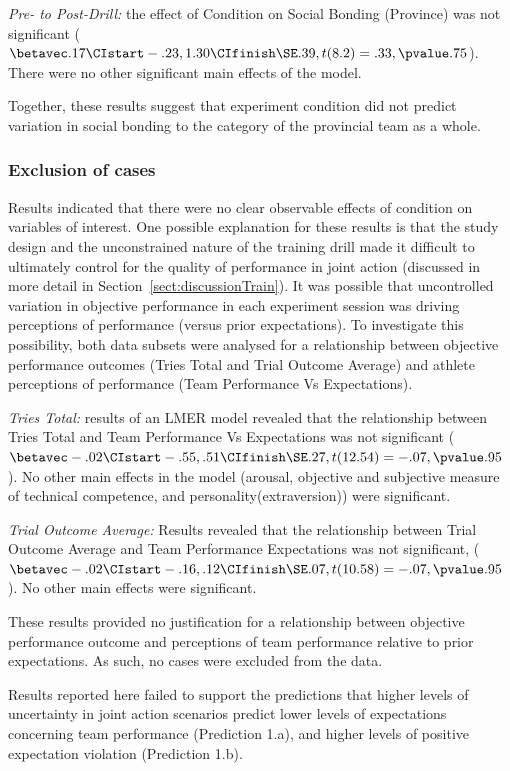 \begin{CJK}{UTF8}{gbsn}
\textit{Pre- to Post-Drill:} the effect of Condition on Social Bonding (Province) was not significant ($\betavec .17 \CIstart -.23, 1.30 \CIfinish \SE .39, t(8.2)= .33, \pvalue .75$). There were no other significant main effects of the model.

Together, these results suggest that experiment condition did not predict variation in social bonding to the category of the provincial team as a whole.



\subsubsection{Exclusion of cases}
Results indicated that there were no clear observable effects of condition on variables of interest.  One possible explanation for these results is that the study design and the unconstrained nature of the training drill made it difficult to ultimately control for the quality of performance in joint action (discussed in more detail in Section~\ref{sect:discussionTrain}).  It was possible that uncontrolled variation in objective performance in each experiment session was driving perceptions of performance (versus prior expectations).  To investigate this possibility, both data subsets were analysed for a relationship between objective performance outcomes (Tries Total and Trial Outcome Average) and athlete perceptions of performance (Team Performance Vs Expectations).

\textit{Tries Total:} results of an LMER model revealed that the relationship between Tries Total and Team Performance Vs Expectations was not significant ($\betavec -.02 \CIstart -.55, .51 \CIfinish \SE .27, t(12.54)= -.07, \pvalue .95$).  No other main effects in the model (arousal, objective and subjective measure of technical competence, and personality(extraversion)) were significant.

\textit{Trial Outcome Average:} Results revealed that the relationship between Trial Outcome Average and Team Performance Expectations was not significant, ($\betavec -.02 \CIstart -.16, .12 \CIfinish \SE .07, t(10.58)= -.07, \pvalue .95$). No other main effects were significant.

These results provided no justification for a relationship between objective performance outcome and perceptions of team performance relative to prior expectations.  As such, no cases were excluded from the data.

Results reported here failed to support the predictions that higher levels of uncertainty in joint action scenarios predict lower levels of expectations concerning team performance (Prediction 1.a), and higher levels of positive expectation violation (Prediction 1.b).


\end{CJK}
